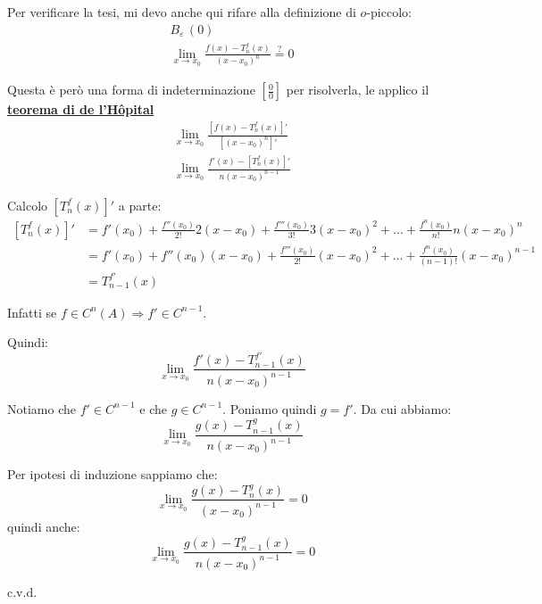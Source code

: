 \documentclass[../../dimostrazioni]{subfiles}
\begin{document}
                Per verificare la tesi, mi devo anche qui rifare alla definizione di \(o\)-piccolo:
                \begin{gather*}
                    B_\varepsilon \, (0)\\
                    \lim_{x \to x_0} \frac{f(x)-T _n ^ f (x)}{(x-x_0)^n} \stackrel{?}{=} 0
                \end{gather*}

                Questa è però una forma di indeterminazione \(\left[\frac{0}{0}\right]\) per risolverla, le applico il \textbf{\hyperref[teoHopital]{teorema di de l'Hôpital}}
                \begin{gather*}
                    \lim_{x \to x_0} \frac{\left[f(x)-T _n ^ f (x)\right]'}{\left[(x-x_0)^n\right]'}\\
                    \lim_{x \to x_0} \frac{f'(x)-\left[T _n ^ f (x)\right]'}{n(x-x_0)^{n-1}}
                \end{gather*}

                Calcolo \(\left[T _n ^ f (x)\right]'\) a parte:
                \begin{align*}
                    \left[T _n ^ f (x)\right]' &= f'(x_0) + \frac{f''(x_0)}{2!}2(x-x_0) + \frac{f'''(x_0)}{3!}3(x-x_0)^2 + \dots + \frac{f^n(x_0)}{n!}n(x-x_0)^n \\
                                            &= f'(x_0) + f''(x_0)(x-x_0) + \frac{f'''(x_0)}{2!}(x-x_0)^2 + \dots + \frac{f^n(x_0)}{(n-1)!}(x-x_0)^{n-1} \\
                                            &= T_{n-1} ^{f'} (x)
                \end{align*}

                Infatti se \(f \in C^n (A) \Rightarrow f' \in C^{n-1} \).

                Quindi:
                \[  \lim_{x \to x_0} \frac{f'(x)-T_{n-1} ^{f'} (x)}{n(x-x_0)^{n-1}}    \]

                Notiamo che \(f' \in C^{n-1}\) e che \(g \in C^{n-1}\). Poniamo quindi \(g = f'\). Da cui abbiamo:
                \[  \lim_{x \to x_0} \frac{g(x)-T_{n-1} ^{g} (x)}{n(x-x_0)^{n-1}}    \]

                Per ipotesi di induzione sappiamo che:
                \[  \lim_{x \to x_0} \frac{g(x) - T _n ^ g (x)}{(x-x_0)^{n-1}} = 0 \]
                quindi anche:
                \[  \lim_{x \to x_0} \frac{g(x)-T_{n-1} ^{g} (x)}{n(x-x_0)^{n-1}}  = 0  \]

                c.v.d.
\end{document}
